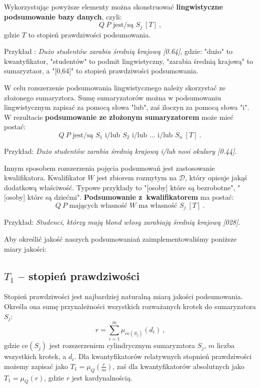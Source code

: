 \documentclass{classrep}
\begin{document}
\vspace\baselineskip

Wykorzystując powyższe elementy można skonstruować \textbf{lingwistyczne podsumowanie
bazy danych}, czyli:
\[Q ~ P \mbox{ jest/są } S_j ~[T] ~\mbox{,}\]
gdzie \(T\) to stopień prawdziwości podsumowania.

\vspace\baselineskip

Przykład : \emph{Dużo studentów zarabia średnią krajową [0.64]}, gdzie: "dużo" to kwantyfikator, "studentów" to podmit lingwistyczny, "zarabia średnią krajową" to sumaryztaor, a "[0,64]" to stopień prawdziwości podsumowania. \newline

W celu rozszerzenie podsumowania lingwistycznego należy skorzystać ze złożonego sumaryztora. Sumę sumaryzatorów można w podsumowaniu lingwistycznym zapisać
za pomocą słowa "lub", zaś iloczyn za pomocą słowa "i".
W rezultacie \textbf{podsumowanie ze złożonym sumaryzatorem} może
mieć postać:
\[Q ~ P \mbox{ jest/są } S_1 \mbox{ i/lub } S_2 \mbox{ i/lub } \ldots \mbox{ i/lub } S_n  ~[T] ~\mbox{.}\]

\vspace\baselineskip

Przykład: \emph{Dużo studentów zarabia średnią krajową i/lub nosi okulary [0.44]}. \newline

Innym sposobem rozszerzenia pojęcia podsumowań
jest zastosowanie kwalifikatora. Kwalifikator
\(W\) jest zbiorem rozmytym na \(\mathcal{D}\),
który opisuje jakąś dodatkową właściwość. Typowe przykłady to "[osoby] które są bezrobotne",
"[osoby] które są dziećmi". \textbf{Podsumowanie
z~kwalifikatorem} ma postać:
\[Q ~ P \mbox{ mających własność } W \mbox{ ma własność } S_j ~[T] ~\mbox{.}\]

\vspace\baselineskip

Przykład: \emph{Studenci, którzy mają blond włosy zarabiają średnią krajową [028]}.\newline

Aby określić jakość naszych podsumowaniań zaimplementowaliśmy poniższe miary jakości:

\subsection{\(T_1\) -- stopień prawdziwości}

Stopień prawdziwości jest najbardziej naturalną miarą jakości podsumowania. Określa ona sumę przynależności wszystkich rozważanych krotek do sumaryzatora \(S_j\):
\[r = \sum_{i=1}^{m} \mu_{\mathrm{ce}(S_j)}(d_i) ~\mbox{,}\]
gdzie \(\mathrm{ce}(S_j)\) jest rozszerzeniem cylindrycznym
sumaryzatora \(S_j\), \(m\) liczba wszystkich krotek, a \(d_i\).
Dla kwantyfikatorów relatywnych stopnień
prawdziwości możemy zapisać jako \(T_1 = \mu_Q(\frac{r}{m})\),
zaś dla kwantyfikatorów absolutnych jako \(T_1 = \mu_Q(r)\), gdzie \(r\) jest kardynalnością. 
\end{document}
